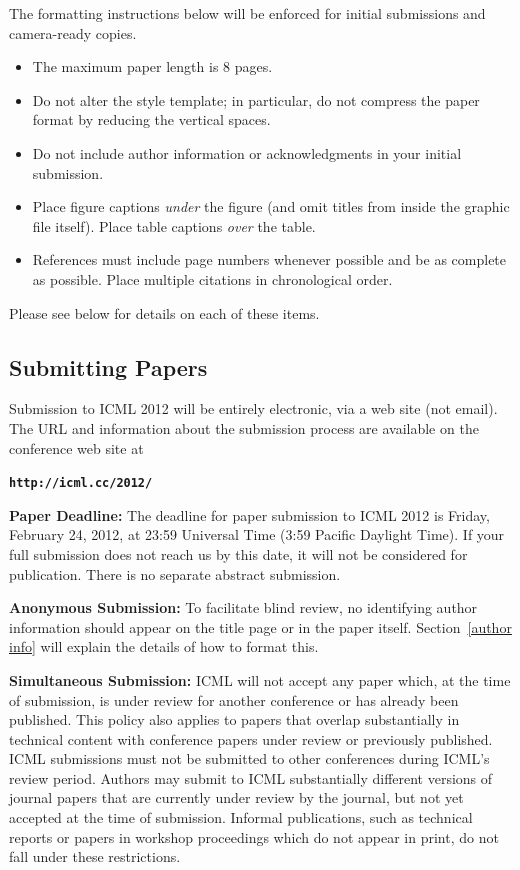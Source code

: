 \documentclass{article}
\begin{document}
The formatting instructions below will be enforced for initial submissions and camera-ready copies.
\begin{itemize}
\item The maximum paper length is 8 pages.
\item Do not alter the style template; in particular, do not compress the paper format by reducing the vertical spaces.
\item Do not include author information or acknowledgments in your
  initial submission.
\item Place figure captions {\em under} the figure (and omit titles from
  inside the graphic file itself).  Place table captions {\em over}
  the table.
\item References must include page numbers whenever possible and be as
  complete as possible.  Place multiple citations in chronological order.
\end{itemize}
Please see below for details on each of these items.

\subsection{Submitting Papers}

Submission to ICML 2012 will be entirely electronic, via a web site
(not email).  The URL and information about the submission process
are available on the conference web site at

\textbf{\texttt{http://icml.cc/2012/}}

{\bf Paper Deadline:} The deadline for paper submission to ICML 2012
is Friday, February 24, 2012, at 23:59 Universal Time (3:59 Pacific Daylight Time).  If your full
submission does not reach us by this date, it will not be considered
for publication. There is no separate abstract submission.

{\bf Anonymous Submission:} To facilitate blind review, no identifying
author information should appear on the title page or in the paper
itself.  Section~\ref{author info} will explain the details of how to
format this.

{\bf Simultaneous Submission:} ICML will not accept any paper which,
at the time of submission, is under review for another conference or
has already been published. This policy also applies to papers that
overlap substantially in technical content with conference papers
under review or previously published. ICML submissions must not be
submitted to other conferences during ICML's review period. Authors
may submit to ICML substantially different versions of journal papers
that are currently under review by the journal, but not yet accepted
at the time of submission. Informal publications, such as technical
reports or papers in workshop proceedings which do not appear in
print, do not fall under these restrictions.
\end{document}
